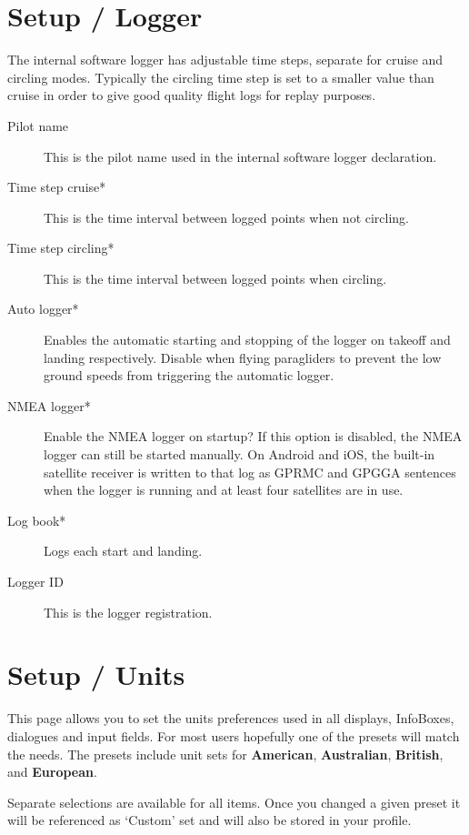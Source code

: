 \section{Setup / Logger} \label{conf:logger}

The internal software logger has adjustable time steps, separate for
cruise and circling modes.  
Typically the circling time step is set to a smaller value
than cruise in order to give good quality flight logs for replay
purposes.

\begin{description}
\item[Pilot name]  This is the pilot name used in the internal software logger 
  declaration.
\item[Time step cruise*]  This is the time interval between logged points when 
  not circling. 
\item[Time step circling*]  This is the time interval between logged points when 
  circling. 
\item[Auto logger*]  Enables the automatic starting and stopping of the logger
  on takeoff and landing respectively. Disable when flying paragliders to prevent 
  the low ground speeds from triggering the automatic logger.
\item[NMEA logger*]  Enable the NMEA logger on startup? If this option is disabled, 
  the NMEA logger can still be started manually.  On Android and iOS,
  the built-in satellite receiver is written to that log as GPRMC and
  GPGGA sentences when the logger is running and at least four
  satellites are in use.
\item[Log book*]  Logs each start and landing.
\item[Logger ID]  This is the logger registration.
\end{description}


\section{Setup / Units}

This page allows you to set the units preferences used in all
displays, InfoBoxes, dialogues and input fields.  
For most users hopefully one of the presets will match the needs.  The presets 
include unit sets for {\bf American}, {\bf Australian}, {\bf British}, 
and {\bf European}.

Separate selections are available for all items. Once you changed a given preset it 
will be referenced as `Custom' set and will also be stored in your profile.

